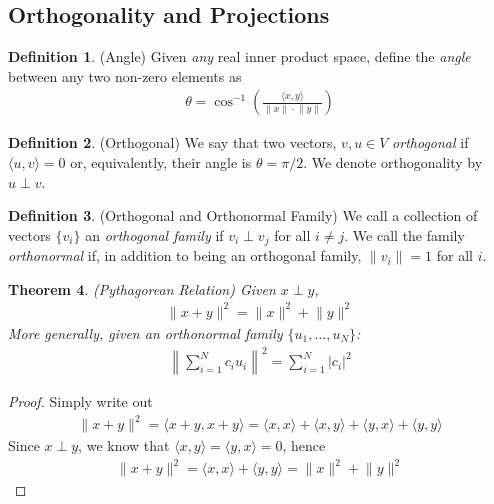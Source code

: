 \documentclass[12pt]{article}
\numberwithin{equation}{section} %
\theoremstyle{plain}
\newtheorem{thm}{Theorem}[section]
\theoremstyle{definition}
\newtheorem{defn}[thm]{Definition}
\theoremstyle{remark}
\begin{document}
\clearpage
\subsection{Orthogonality and Projections}

\begin{defn}(Angle)
Given \emph{any} real inner product space, define the \emph{angle}
between any two non-zero elements as
\begin{align*}
  \theta = \cos^{-1}\left(
  \frac{\langle x,y \rangle}{\lVert x\rVert \cdot \lVert y \rVert}
  \right)
\end{align*}

\end{defn}

\begin{defn}(Orthogonal)
We say that two vectors, $v,u\in V$ \emph{orthogonal} if $\langle
u,v\rangle=0$ or, equivalently, their angle is $\theta=\pi/2$. We denote
orthogonality by $u\perp v$.
\end{defn}

\begin{defn}(Orthogonal and Orthonormal Family)
We call a collection of vectors $\{v_i\}$ an \emph{orthogonal family} if
$v_i\perp v_j$ for all $i\neq j$. We call the family \emph{orthonormal}
if, in addition to being an orthogonal family, $\lVert v_i\rVert=1$ for
all $i$.
\end{defn}

\begin{thm}
\label{pythag}
\emph{(Pythagorean Relation)} Given $x\perp y$,
\begin{align*}
    \lVert x + y\rVert^2 = \lVert x\rVert^2 + \lVert y \rVert^2
\end{align*}
More generally, given an orthonormal family $\{u_1,\ldots,u_N\}$:
\begin{align*}
  \left\lVert \sum_{i=1}^N c_i u_i \right\rVert^2
  = \sum_{i=1}^N |c_i|^2
\end{align*}
\end{thm}
\begin{proof}
Simply write out
\begin{align*}
  \lVert x + y\rVert^2 =
  \langle x + y, x + y\rangle
  =
  \langle x , x \rangle
  +
  \langle x , y \rangle
  +
  \langle y , x \rangle
  +
  \langle y , y \rangle
\end{align*}
Since $x\perp y$, we know that $\langle x,y \rangle = \langle y,x
\rangle =0$, hence
\begin{align*}
  \lVert x + y\rVert^2 =
  \langle x , x \rangle
  +
  \langle y , y \rangle
  =
  \lVert x\rVert^2 + \lVert y\rVert^2
\end{align*}
\end{proof}
\end{document}
